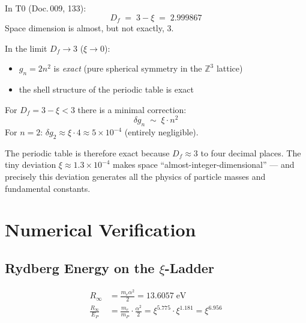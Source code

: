 In T0 (Doc.\,009, 133):
\begin{equation}
  D_f \;=\; 3 - \xi \;=\; 2.999867
\end{equation}
Space dimension is almost, but not exactly, 3.

In the limit $D_f \to 3$ ($\xi \to 0$):
\begin{itemize}
  \item $g_n = 2n^2$ is \emph{exact} (pure spherical symmetry in the $\mathbb{Z}^3$ lattice)
  \item the shell structure of the periodic table is exact
\end{itemize}

For $D_f = 3 - \xi < 3$ there is a minimal correction:
\begin{equation}
  \delta g_n \;\sim\; \xi \cdot n^2
\end{equation}
For $n = 2$: $\delta g_2 \approx \xi \cdot 4 \approx 5 \times 10^{-4}$
(entirely negligible).

The periodic table is therefore exact because $D_f \approx 3$ to four decimal
places. The tiny deviation $\xi \approx 1.3 \times 10^{-4}$ makes space
``almost-integer-dimensional'' — and precisely this deviation generates all
the physics of particle masses and fundamental constants.

\section{Numerical Verification}
\label{sec:numerics}

\subsection{Rydberg Energy on the \texorpdfstring{$\xi$}{xi}-Ladder}

\begin{align}
  R_\infty &= \frac{m_e \alpha^2}{2} = 13.6057\;\text{eV} \\
  \frac{R_\infty}{E_P} &= \frac{m_e}{m_P} \cdot \frac{\alpha^2}{2}
    = \xi^{5.775} \cdot \xi^{1.181} = \xi^{6.956}
\end{align}

\begin{table}[htbp]
\centering
\caption{Rydberg energy: T0 derivation vs. measurement}
\label{tab:rydberg}
\end{table}

